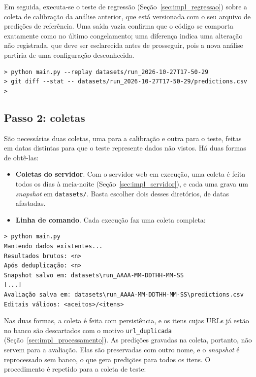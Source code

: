 Em seguida, executa-se o teste de regressão (Seção~\ref{sec:impl_regressao})
sobre a coleta de calibração da análise anterior, que está versionada com o seu
arquivo de predições de referência. Uma saída vazia confirma que o código se
comporta exatamente como no último congelamento; uma diferença indica uma
alteração não registrada, que deve ser esclarecida antes de prosseguir, pois a
nova análise partiria de uma configuração desconhecida.

\begin{footnotesize}
\begin{verbatim}
> python main.py --replay datasets/run_2026-10-27T17-50-29
> git diff --stat -- datasets/run_2026-10-27T17-50-29/predictions.csv
>
\end{verbatim}
\end{footnotesize}

\subsection{Passo 2: coletas}

São necessárias duas coletas, uma para a calibração e outra para o teste,
feitas em datas distintas para que o teste represente dados não vistos. Há
duas formas de obtê-las:

\begin{itemize}
  \item \textbf{Coletas do servidor}. Com o servidor web em execução, uma
    coleta é feita todos os dias à meia-noite (Seção~\ref{sec:impl_servidor}),
    e cada uma grava um \textit{snapshot} em \texttt{datasets/}. Basta escolher
    dois desses diretórios, de datas afastadas.
  \item \textbf{Linha de comando}. Cada execução faz uma coleta completa:
\end{itemize}

\begin{footnotesize}
\begin{verbatim}
> python main.py
Mantendo dados existentes...
Resultados brutos: <n>
Após deduplicação: <n>
Snapshot salvo em: datasets\run_AAAA-MM-DDTHH-MM-SS
[...]
Avaliação salva em: datasets\run_AAAA-MM-DDTHH-MM-SS\predictions.csv
Editais válidos: <aceitos>/<itens>
\end{verbatim}
\end{footnotesize}

Nas duas formas, a coleta é feita com persistência, e os itens cujas URLs já
estão no banco são descartados com o motivo \texttt{url\_duplicada}
(Seção~\ref{sec:impl_processamento}). As predições gravadas na coleta,
portanto, não servem para a avaliação. Elas são preservadas com outro nome, e
o \textit{snapshot} é reprocessado sem banco, o que gera predições para todos
os itens. O procedimento é repetido para a coleta de teste:

